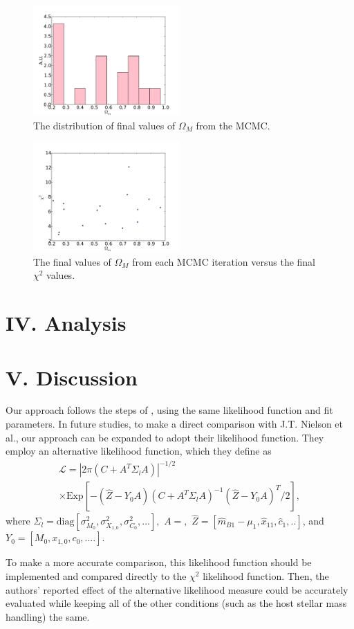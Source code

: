 \documentclass[aps,prl,reprint]{revtex4-1}
\begin{document}
\begin{figure}
 \includegraphics[width=0.5\textwidth]{../plots/om_hist.pdf}
\caption{\label{fig:omhist}The distribution of final values of $\Omega_M$ from the MCMC.}
\end{figure}
\begin{figure}
 \includegraphics[width=0.5\textwidth]{../plots/om_chi.pdf}
\caption{\label{fig:chi2}The final values of $\Omega_M$ from each MCMC iteration versus the final $\chi^2$ values.}
\end{figure}
\section{IV. Analysis} 
\section{V. Discussion}
Our approach follows the steps of \cite{sdss}, using the same likelihood function and fit parameters. In future studies, to make a direct comparison with J.T. Nielson et al., our approach can be expanded to adopt their likelihood function. 
They employ an alternative likelihood function, which they define as \begin{align*}\mathscr{L} = |2\pi(C+A^T \Sigma_l A)|^{-1/2}\; \\
\times \text{Exp}[-(\hat{Z}-Y_0A)(C+A^T\Sigma_lA)^{-1}(\hat{Z}-Y_0A)^T/2],\end{align*} where $\Sigma_l = \text{diag}[\sigma_{M_0}^2,\sigma_{X_{1,0}}^2,\sigma_{C_0}^2,...],$ $A = ,$ $\hat{Z} = [\hat{m}_{B1}-\mu_1, \hat{x}_{11},\hat{c}_1,..]$, and $Y_0 = [M_0,x_{1,0},c_0,....]$. 
\par To make a more accurate comparison, this likelihood function should be implemented and compared directly to the $\chi^2$ likelihood function. Then, the authors' reported effect of the alternative likelihood measure could be accurately evaluated while keeping all of the other conditions (such as the host stellar mass handling) the same. 


 
 
\end{document}
